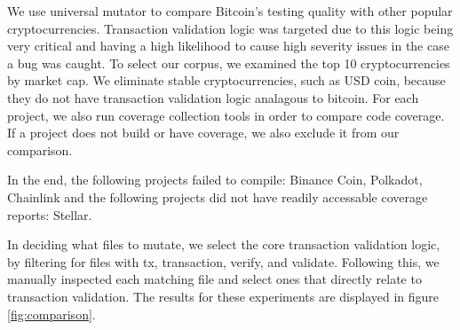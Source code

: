 We use universal mutator to compare Bitcoin's testing quality with other popular cryptocurrencies. Transaction validation logic was targeted
due to this logic being very critical and having a high likelihood to cause high severity issues in the case a bug was caught. To select
our corpus, we examined the top 10 cryptocurrencies by market cap. We eliminate stable cryptocurrencies, such as USD coin,
because they do not have transaction validation logic analagous to bitcoin. For each project, we also run coverage collection
tools in order to compare code coverage. If a project does not build or have coverage, we also exclude it from our comparison.

In the end, the following projects failed to compile: Binance Coin, Polkadot, Chainlink and the following projects did not have
readily accessable coverage reports: Stellar.

In deciding what files to mutate, we select the core transaction validation logic, by filtering for files
with tx, transaction, verify, and validate. Following this, we manually inspected each matching file and select
ones that directly relate to transaction validation. The results for these experiments are displayed in figure \ref{fig:comparison}.